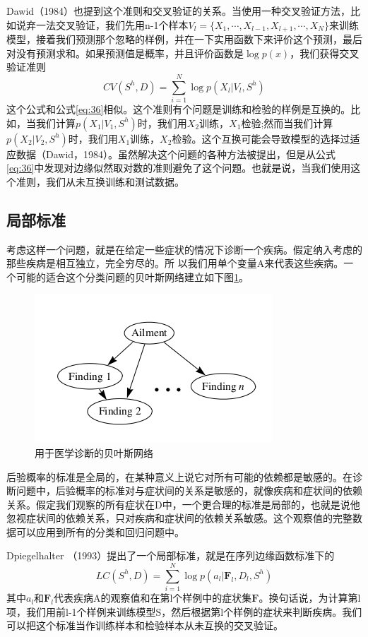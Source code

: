 \documentclass[10pt,a4paper]{article}
\begin{document}
\begin{CJK*}{UTF8}{gkai}
Dawid（1984）也提到这个准则和交叉验证的关系。当使用一种交叉验证方法，比如说弃一法交叉验证，我们先用n-1个样本$V_l=\{X_1,\cdots,X_{l-1},X_{l+1},\cdots,X_N\}$来训练模型，接着我们预测那个忽略的样例，并在一下实用函数下来评价这个预测，最后对没有预测求和。如果预测值是概率，并且评价函数是$\log p(x)$，我们获得交叉验证准则
\begin{equation}
CV(S^h,D)=\sum_{i=1}^N \log p(X_l|V_l,S^h)
\end{equation}
这个公式和公式\ref{eq:36}相似。这个准则有个问题是训练和检验的样例是互换的。比如，当我们计算$p(X_1|V_1,S^h)$时，我们用$X_2$训练，$X_1$检验;然而当我们计算$p(X_2|V_2,S^h)$时，我们用$X_1$训练，$X_2$检验。这个互换可能会导致模型的选择过适应数据（Dawid，1984）。虽然解决这个问题的各种方法被提出，但是从公式\ref{eq:36}中发现对边缘似然取对数的准则避免了这个问题。也就是说，当我们使用这个准则，我们从未互换训练和测试数据。


\subsection{局部标准}
考虑这样一个问题，就是在给定一些症状的情况下诊断一个疾病。假定纳入考虑的那些疾病是相互独立，完全穷尽的。所 以我们用单个变量A来代表这些疾病。一个可能的适合这个分类问题的贝叶斯网络建立如下图\ref{fig:ailment}。
\begin{figure}[!htbp]
	\centering
    	\includegraphics[scale=0.6]{figs/ailment.png}
	\caption{用于医学诊断的贝叶斯网络}    
	\label{fig:ailment}
\end{figure}


后验概率的标准是全局的，在某种意义上说它对所有可能的依赖都是敏感的。在诊断问题中，后验概率的标准对与症状间的关系是敏感的，就像疾病和症状间的依赖关系。假定我们观察的所有症状在D中，一个更合理的标准是局部的，也就是说他忽视症状间的依赖关系，只对疾病和症状间的依赖关系敏感。这个观察值的完整数据可以应用到所有的分类和回归问题中。


Dpiegelhalter （1993）提出了一个局部标准，就是在序列边缘函数标准下的
\begin{equation}
\label{eq:38}
LC(S^h,D)=\sum_{i=1}^N \log p(a_l| \boldsymbol{F}_l,D_l,S^h)
\end{equation}
其中$a_l$和$\boldsymbol{F}_l$代表疾病A的观察值和在第l个样例中的症状集$\boldsymbol{F}$。换句话说，为计算第l项，我们用前l-1个样例来训练模型S，然后根据第l个样例的症状来判断疾病。我们可以把这个标准当作训练样本和检验样本从未互换的交叉验证。



\end{CJK*}
\end{document}
